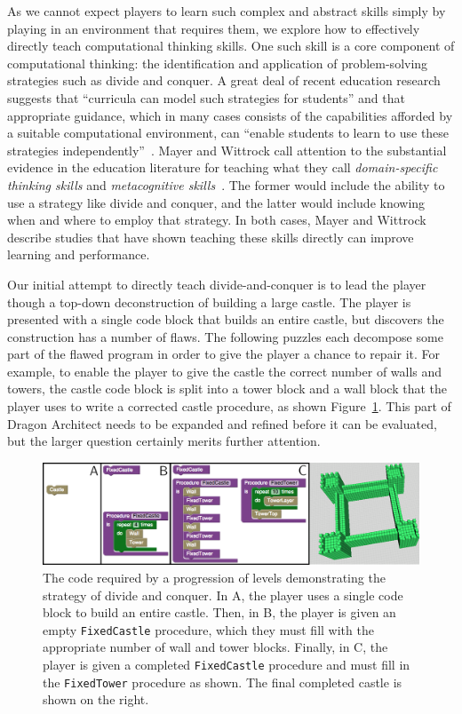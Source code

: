 \documentclass{sig-alternate}
\newcommand{\gametitle}{{Dragon Architect}}
\begin{document}
As we cannot expect players to learn such complex and abstract skills simply by playing in an environment that requires them, we explore how to effectively directly teach computational thinking skills.
One such skill is a core component of computational thinking: the identification and application of problem-solving strategies such as divide and conquer.
A great deal of recent education research suggests that ``curricula can model such strategies for students'' and that appropriate guidance, which in many cases consists of the capabilities afforded by a suitable computational environment, can ``enable students to learn to use these strategies independently''~\cite{report2010computational}.
Mayer and Wittrock call attention to the substantial evidence in the education literature for teaching what they call \emph{domain-specific thinking skills} and \emph{metacognitive skills}~\cite{mayer1996handbook}.
The former would include the ability to use a strategy like divide and conquer, and the latter would include knowing when and where to employ that strategy.
In both cases, Mayer and Wittrock describe studies that have shown teaching these skills directly can improve learning and performance.

Our initial attempt to directly teach divide-and-conquer is to lead the player though a top-down deconstruction of building a large castle.
The player is presented with a single code block that builds an entire castle, but discovers the construction has a number of flaws. 
The following puzzles each decompose some part of the flawed program in order to give the player a chance to repair it. 
For example, to enable the player to give the castle the correct number of walls and towers, the castle code block is split into a tower block and a wall block that the player uses to write a corrected castle procedure, as shown Figure~\ref{fig:decomp}. 
This part of \gametitle{} needs to be expanded and refined before it can be evaluated, but the larger question certainly merits further attention. 

\begin{figure}[th!]
  \centering
  \includegraphics[width=\textwidth]{images/decomp-code}
  \caption{The code required by a progression of levels demonstrating the strategy of divide and conquer. In A, the player uses a single code block to build an entire castle. Then, in B, the player is given an empty \texttt{FixedCastle} procedure, which they must fill with the appropriate number of wall and tower blocks. Finally, in C, the player is given a completed \texttt{FixedCastle} procedure and must fill in the \texttt{FixedTower} procedure as shown. The final completed castle is shown on the right.}
  \label{fig:decomp}
\end{figure}
\end{document}

